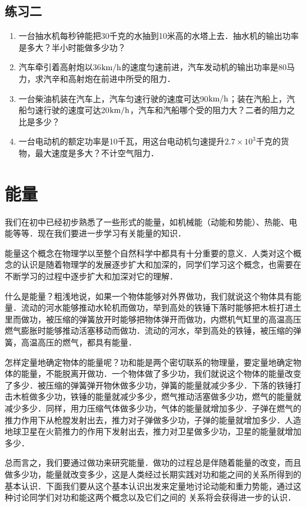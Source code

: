 \subsection*{练习二}
\begin{enumerate}
    \item 一台抽水机每秒钟能把30千克的水抽到10米高的水塔上去．抽水机的输出功率是多大？半小时能做多少功？
    \item 汽车牵引着高射炮以36$\text{km}/\text{h}$的速度匀速前进，汽车发动机的输出功率是80马力，求汽辛和高射炮在前进中所受的阻力．
    \item 一台柴油机装在汽车上，汽车匀速行驶的速度可达90$\text{km}/\text{h}$；装在汽船上，汽船匀速行驶的速度可达20$\text{km}/\text{h}$，汽车和汽船哪个受的阻力大？二者的阻力之比是多少？
    \item 一台电动机的额定功率是10千瓦，用这台电动机匀速提升$2.7\times 10^3$千克的货物，最大速度是多大？不计空气阻力．
\end{enumerate}

\section{能量}
我们在初中已经初步熟悉了一些形式的能量，如机械能（动能和势能）、热能、电能等等．现在我们要进一步学习有关能量的知识．

能量这个概念在物理学以至整个自然科学中都具有十分重要的意义．人类对这个概念的认识是随着物理学的发展逐步扩大和加深的，同学们学习这个概念，也需要在不断学习的过程中逐步扩大和加深对它的理解．

什么是能量？粗浅地说，如果一个物体能够对外界做功，我们就说这个物体具有能量．流动的河水能够推动水轮机而做功，举到高处的铁锤下落时能够把木桩打进土里而做功，被压缩的弹簧放开时能够把物体弹开而做功，内燃机气缸里的高温高压燃气膨胀时能够推动活塞移动而做功．流动的河水，举到高处的铁锤，被压缩的弹簧，高温高压的燃气，都具有能量．

怎样定量地确定物体的能量呢？功和能是两个密切联系的物理量，要定量地确定物体的能量，不能脱离开做功．一个物体做了多少功，我们就说这个物体的能量改变了多少．被压缩的弹簧弹开物休做多少功，弹簧的能量就减少多少．下落的铁锤打击木桩做多少功，铁锤的能量就减少多少，燃气推动活塞做多少功，燃气的能量就减少多少．同样，用力压缩气体做多少功，气体的能量就增加多少．子弹在燃气的推力作用下从枪膛发射出去，推力对子弹做多少功，子弹的能量就增加多少．人造地球卫星在火箭推力的作用下发射出去，推力对卫星做多少功，卫星的能量就增加多少．

总而言之，我们要通过做功来研究能量．做功的过程总是伴随着能量的改变，而且做多少功，能量就改变多少，这是人类经过长期实践对功和能之间的关系所得到的基本认识．下面我们要从这个基本认识出发来定量地讨论动能和重力势能，通过这种讨论同学们对功和能这两个概念以及它们之间的
关系将会获得进一步的认识．


